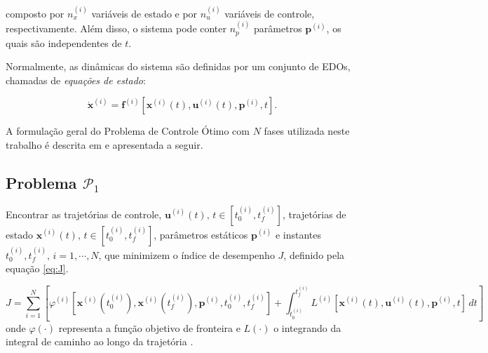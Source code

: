 \noindent composto por $n_x^{(i)}$ variáveis de estado e por $n_u^{(i)}$ variáveis de controle, respectivamente. Além disso, o sistema pode conter $n_p^{(i)}$ parâmetros $\mathbf{p}^{(i)}$, os quais são independentes de $t$.

Normalmente, as dinâmicas do sistema são definidas por um conjunto de EDOs, chamadas de \textit{equações de estado}:

\begin{equation*}
    \dot{\mathbf{x}}^{(i)} = \mathbf{f}^{(i)} \left[ \mathbf{x}^{(i)}(t), \mathbf{u}^{(i)}(t), \mathbf{p}^{(i)}, t \right].
\end{equation*}

A formulação geral do Problema de Controle Ótimo com $N$ fases utilizada neste trabalho é descrita em \cite{becerra_psopt_2022} e apresentada a seguir.

\subsection*{Problema $\mathcal{P}_1$}
\label{subsec:problema-1}

\noindent Encontrar as trajetórias de controle, $\mathbf{u}^{(i)}(t), \, t \in \left[ t_0^{(i)}, t_f^{(i)} \right]$, trajetórias de estado $\mathbf{x}^{(i)}(t), \, t \in \left[ t_0^{(i)}, t_f^{(i)} \right]$, parâmetros estáticos $\mathbf{p}^{(i)}$ e instantes $t_0^{(i)}, t_f^{(i)}, \, i = 1, \cdots, N$, que minimizem o índice de desempenho $J$, definido pela equação \ref{eq:J}.

\begin{equation}
    \label{eq:J}
    J = \sum_{i=1}^{N} \left[ 
        \varphi^{(i)} \left[ \mathbf{x}^{(i)} \left( t_0^{(i)} \right), \mathbf{x}^{(i)} \left( t_f^{(i)} \right), \mathbf{p}^{(i)}, t_0^{(i)}, t_f^{(i)} \right]
        + \int_{t_0^{(i)}}^{t_f^{(i)}} L^{(i)} \left[ \mathbf{x}^{(i)}(t), \mathbf{u}^{(i)}(t), \mathbf{p}^{(i)}, t \right] \, dt
    \right]
\end{equation}
\noindent onde $\varphi(\cdot)$ representa a função objetivo de fronteira e $L(\cdot)$ o integrando da integral de caminho ao longo da trajetória \cite{kelly_introduction_2017}. 

